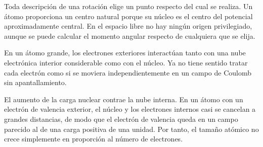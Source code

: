 Toda descripción de una rotación elige un punto respecto del cual se realiza. Un átomo proporciona un centro natural porque su núcleo es el centro del potencial aproximadamente central. En el espacio libre no hay ningún origen privilegiado, aunque se puede calcular el momento angular respecto de cualquiera que se elija.

\begin{classroomqa}
\end{classroomqa}

En un átomo grande, los electrones exteriores interactúan tanto con una nube electrónica interior considerable como con el núcleo. Ya no tiene sentido tratar cada electrón como si se moviera independientemente en un campo de Coulomb sin apantallamiento.

\begin{classroomqa}
\end{classroomqa}

El aumento de la carga nuclear contrae la nube interna. En un átomo con un electrón de valencia exterior, el núcleo y los electrones internos casi se cancelan a grandes distancias, de modo que el electrón de valencia queda en un campo parecido al de una carga positiva de una unidad. Por tanto, el tamaño atómico no crece simplemente en proporción al número de electrones.

\begin{classroomqa}
\end{classroomqa}

